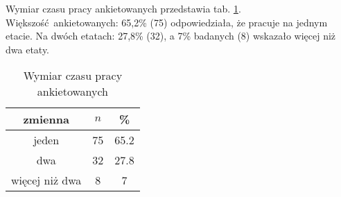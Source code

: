 
Wymiar czasu pracy ankietowanych przedstawia tab. \ref{tab:Q2}. Większość ankietowanych: 65,2\% (75) odpowiedziała, że pracuje na jednym etacie. Na dwóch etatach: 27,8\% (32), a 7\% badanych (8) wskazało więcej niż dwa etaty.
\begin{table}[H]
\caption{Wymiar czasu pracy ankietowanych}
\centering
\begin{tabular}{ | c | c | c |}
\hline
zmienna & $n$ & \% \\
\hline
jeden  &  75  & 65.2 \\
\hline
dwa  &  32  & 27.8 \\
\hline
więcej niż dwa  &  8  & 7 \\
\hline
\end{tabular}
\label{tab:Q2}
\end{table}


